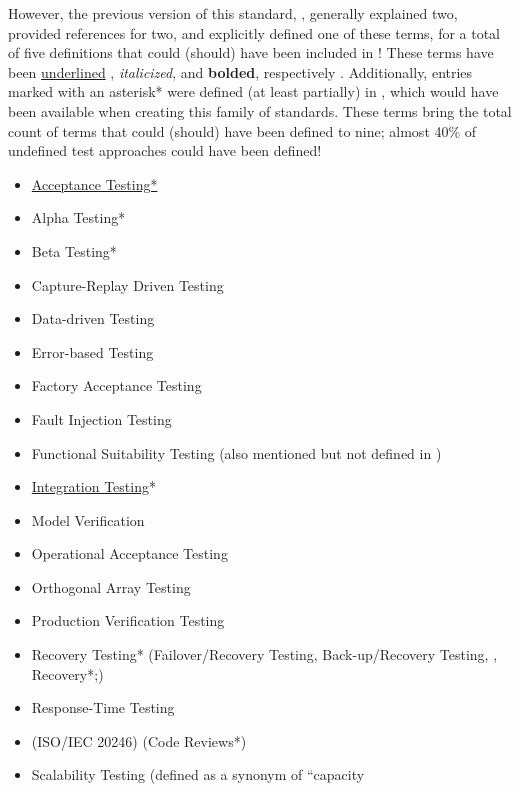       However, the previous version of this standard, \citeyearpar{IEEE2013},
      generally explained two, provided references for two, and explicitly defined
      one of these terms, for a total of five definitions that could (should) have
      been included in \citeyearpar{IEEE2022}! These terms have been
      \underline{underlined}\ifnotpaper%
            , \emph{italicized}, and \textbf{bolded}, respectively%
      \fi. Additionally, entries marked with an asterisk* were defined (at least
      partially) in \citeyearpar{IEEE2017}, which would have been available when
      creating this family of standards. These terms bring the total count of terms
      that could (should) have been defined to nine; almost 40\% of undefined test
      approaches could have been defined!

      \begin{itemize}
            \item \underline{Acceptance Testing*}
            \item Alpha Testing*
            \item Beta Testing*
            \item Capture-Replay Driven Testing
            \item Data-driven Testing
            \item Error-based Testing
            \item Factory Acceptance Testing
            \item Fault Injection Testing
            \item Functional Suitability Testing (also mentioned but not defined in
                  \citep{IEEE2017})
            \item \underline{Integration Testing}*
            \item Model Verification
            \item Operational Acceptance Testing
            \item Orthogonal Array Testing
            \item Production Verification Testing
            \item Recovery Testing* (Failover/Recovery Testing, Back-up/Recovery
                  Testing, ,
                  Recovery*;)
            \item Response-Time Testing
            \item {} (ISO/IEC 20246) (Code Reviews*)
            \item Scalability Testing (defined as a synonym of ``capacity

\end{itemize}
